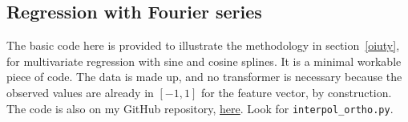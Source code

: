 \documentclass[oneside,10pt]{book}
\begin{document}
\subsection{Regression with Fourier series}\label{orthofou}

The basic code here is provided to illustrate the methodology in section~\ref{oiuty}, for multivariate regression with sine and cosine splines. It is a minimal workable piece of code. The
 data is made up, and no transformer is necessary because the observed values are already in $[-1,1]$ for the feature vector, by construction. The code is also
 on my GitHub repository,
\href{https://github.com/VincentGranville/Statistical-Optimization/blob/main/interpol_ortho.py}{here}.
 Look for \texttt{interpol\_ortho.py}. \vspace{1ex}
\end{document}

